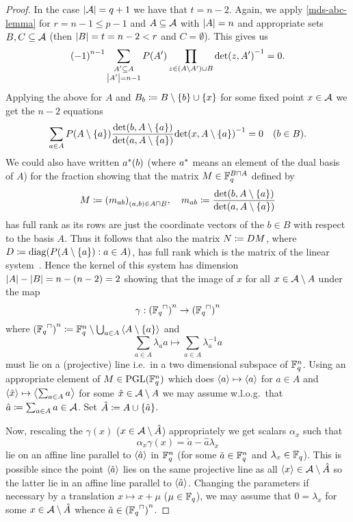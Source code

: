 \begin{proof}
    In the case $\left\vert{\mathcal{A}}\right\vert=q+1$ we have that $t=n-2$.
    Again, we apply \autoref{mds-abc-lemma} for $r=n-1\leq p-1$ and $A\subseteq \mathcal{A}$ with
    $\left\vert{A}\right\vert=n$ and appropriate sets $B,C\subseteq \mathcal{A}$ (then
    $\left\vert{B}\right\vert=t=n-2<r$ and $C=\emptyset$). This gives us
    $$ {(-1)}^{n-1}\sum_{\substack{A'\subseteq A \\
            \left\vert{A'}\right\vert=n-1}}{P(A')\prod_{z\in (A\setminus A')\cup
            B}{{\det(z,A')}^{-1}}} = 0.
    $$
    Applying the above for $A$ and $B_b\defeq B\setminus\set{b}\setjoin\set{x}$ for some fixed point $x\in \mathcal{A}$ we get the $n-2$ equations
    $$
    \sum_{a\in A}{P(A\setminus\set{a})\frac{\det(b,A\setminus\set{a})}{\det(a,A\setminus\set{a})}{\det(x,A\setminus\set{a})}^{-1}} = 0\quad (b\in B).\label{mds-class-n-leq-p-keysys}
    $$
    We could also have written ${a}^{\ast}(b)$ (where ${a}^{\ast}$ means an element of the dual basis of $A$) for the fraction showing that the matrix $M\in\field{q}^{B\setprod A}$ defined by
    $$
    M\defeq {(m_{ab})}_{(a,b)\in A\setprod B},\quad
    m_{ab} \defeq \frac{\det(b,A\setminus\set{a})}{\det(a,A\setminus\set{a})}
    $$
    has full rank as its rows are just the coordinate vectors of the $b\in B$ with respect to the basis $A$.
    Thus it follows that also the matrix $N\mathrel{\mathrel{\mathop:}\mkern-1.2mu=} DM$, where $D\defeq \diag(P(A\setminus\set{a}):a\in A)$, has full rank which is the matrix of the linear system~.
    Hence the kernel of this system has dimension $\left\vert{A}\right\vert-\left\vert{B}\right\vert=n-(n-2)=2$ showing that the image of $x$ for all $x\in \mathcal{A}\setminus A$ under the map
    $$
    \gamma:{(\units{\field{q}})}^n\to{(\units{\field{q}})}^n
    $$
    where ${(\units{\field{q}})}^n\defeq \field{q}^n\setminus\Setjoin_{a\in A}{\gen{A\setminus\set{a}}}$ and
    $$
    \sum_{a\in A}{\lambda_a a}\mapsto \sum_{a\in A}{\lambda_a^{-1} a}
    $$
    must lie on a (projective) line i.e.~in a two dimensional subspace of $\mathbb{F}_{q}^n$.
    Using an appropriate element of $M\in\mathrm{PGL}(\mathbb{F}_{q}^n)$ which does $\gen a \mapsto \gen a$ for $a\in A$ and $\gen{\hat x}\mapsto \gen{\sum_{a\in A}{a}}$ for some $\hat x\in \mathcal{A}\setminus A$ we may assume w.l.o.g.~that $\hat a\mathrel{\mathrel{\mathop:}\mkern-1.2mu=} \sum_{a\in A}{a}\in \mathcal{A}$. Set $\hat{A}\defeq A\setjoin\set{\hat a}$. 

    Now, rescaling the $\gamma(x)$ ($x\in\mathcal{A}\setminus \hat A$) appropriately we get scalars $\alpha_x$ such that
    $$
    \alpha_x\gamma(x)=\check a-\hat a\lambda_x
    $$
    lie on an affine line parallel to $\gen{\hat a}$ in $\mathbb{F}_{q}^n$ (for some $\check a\in\mathbb{F}_{q}^n$ and $\lambda_x\in\mathbb{F}_{q}$). This is possible since the point $\gen{\hat a}$ lies on the same projective line as all $\gen x\in\cA\setminus \hat A$ so the latter lie in an affine line parallel to $\gen{\hat a}$.
    Changing the parameters if necessary by a translation $x\mapsto x+\mu$ ($\mu\in\mathbb{F}_{q}$), we may assume that $0=\lambda_x$ for some $x\in \mathcal{A}\setminus \hat{A}$ whence $\check a\in {(\units{\field{q}})}^n$.


\end{proof}
